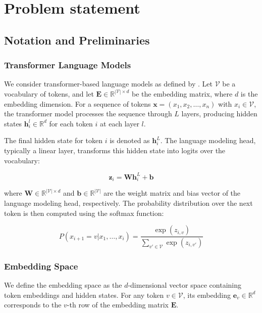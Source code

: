\chapter{Problem statement}

\section{Notation and Preliminaries}

\subsection{Transformer Language Models}

We consider transformer-based language models as defined by \cite{vaswani2017attention}. Let $\mathcal{V}$ be a vocabulary of tokens, and let $\mathbf{E} \in \mathbb{R}^{|\mathcal{V}| \times d}$ be the embedding matrix, where $d$ is the embedding dimension. For a sequence of tokens $\mathbf{x} = (x_1, x_2, \ldots, x_n)$ with $x_i \in \mathcal{V}$, the transformer model processes the sequence through $L$ layers, producing hidden states $\mathbf{h}_i^l \in \mathbb{R}^d$ for each token $i$ at each layer $l$.

The final hidden state for token $i$ is denoted as $\mathbf{h}_i^L$. The language modeling head, typically a linear layer, transforms this hidden state into logits over the vocabulary:

\begin{equation}
    \mathbf{z}_i = \mathbf{W} \mathbf{h}_i^L + \mathbf{b}
    \label{eq::lm_head}
\end{equation}

where $\mathbf{W} \in \mathbb{R}^{|\mathcal{V}| \times d}$ and $\mathbf{b} \in \mathbb{R}^{|\mathcal{V}|}$ are the weight matrix and bias vector of the language modeling head, respectively. The probability distribution over the next token is then computed using the softmax function:

\begin{equation}
    P(x_{i+1} = v | x_1, \ldots, x_i) = \frac{\exp(z_{i,v})}{\sum_{v' \in \mathcal{V}} \exp(z_{i,v'})}
    \label{eq::softmax}
\end{equation}

\subsection{Embedding Space}

We define the embedding space as the $d$-dimensional vector space containing token embeddings and hidden states. For any token $v \in \mathcal{V}$, its embedding $\mathbf{e}_v \in \mathbb{R}^d$ corresponds to the $v$-th row of the embedding matrix $\mathbf{E}$.

